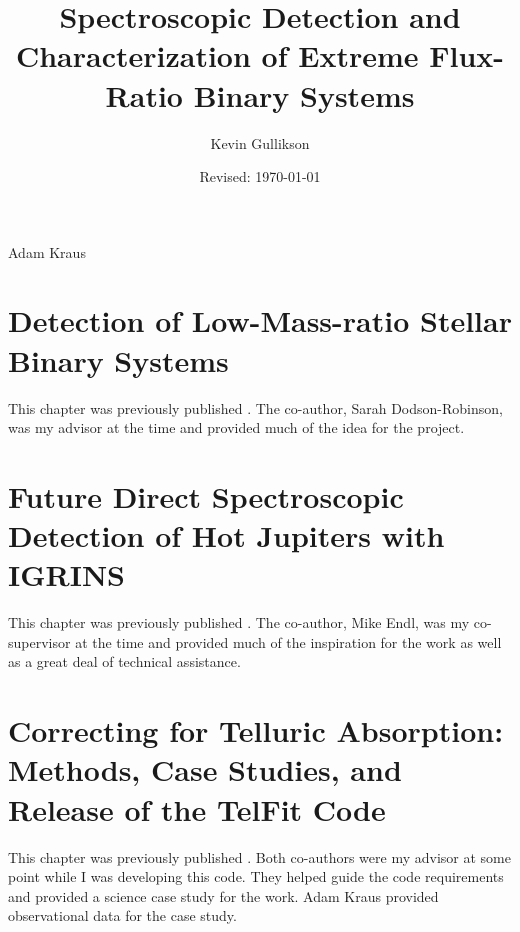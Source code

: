 \documentclass{utthesis}
\begin{document}
\author{Kevin Gullikson}
\title{Spectroscopic Detection and Characterization of Extreme Flux-Ratio Binary Systems}
\date{Revised: \today}

\UTcopyrightlegend %

\begin{UTcommittee}
\end{UTcommittee}


\frontmatter

\setcounter{page}{4}

%
%

\begin{UTabstract}{Adam Kraus}
\lipsum[1]
\end{UTabstract}


\tableofcontents

\listoffigures

\mainmatter

\chapter{Detection of Low-Mass-ratio Stellar Binary Systems}
This chapter was previously published \citep{Gullikson2013_2}. The co-author, Sarah Dodson-Robinson, was my advisor at the time and provided much of the idea for the project.



\chapter{Future Direct Spectroscopic Detection of Hot Jupiters with IGRINS}
This chapter was previously published \citep{Gullikson2013}. The co-author, Mike Endl, was my co-supervisor at the time and provided much of the inspiration for the work as well as a great deal of technical assistance.



\chapter{Correcting for Telluric Absorption: Methods, Case Studies, and Release of the TelFit Code}
This chapter was previously published \citep{Gullikson2014}. Both co-authors were my advisor at some point while I was developing this code. They helped guide the code requirements and provided a science case study for the work. Adam Kraus provided observational data for the case study.
\end{document}
